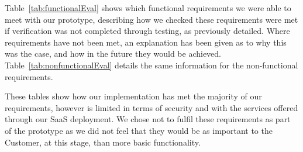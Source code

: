 \documentclass[10pt,a4paper]{article}
\begin{document}
Table~\ref{tab:functionalEval} shows which functional requirements we were able to meet with our prototype, describing how we checked these requirements were met if verification was not completed through testing, as previously detailed. Where requirements have not been met, an explanation has been given as to why this was the case, and how in the future they would be achieved. Table~\ref{tab:nonfunctionalEval} details the same information for the non-functional requirements.

These tables show how our implementation has met the majority of our requirements, however is limited in terms of security and with the services offered through our SaaS deployment. We chose not to fulfil these requirements as part of the prototype as we did not feel that they would be as important to the Customer, at this stage, than more basic functionality.
\end{document}
